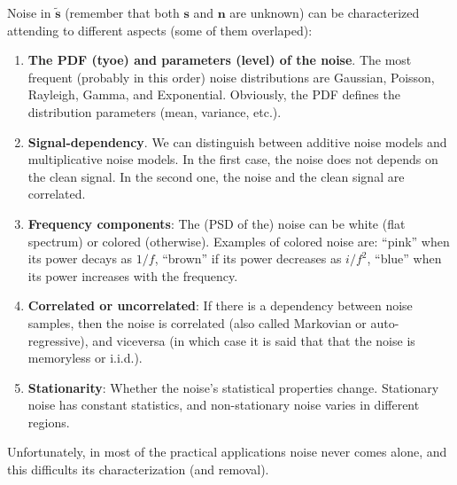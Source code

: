 Noise in $\tilde{\mathbf{s}}$ (remember that both $\mathbf{s}$ and
$\mathbf{n}$ are unknown) can be characterized attending to different
aspects (some of them overlaped):
\begin{enumerate}
\item \textbf{The \gls{PDF} (tyoe) and parameters (level) of the
    noise}. The most frequent (probably in this order) noise
  distributions are Gaussian, Poisson, Rayleigh, Gamma, and
  Exponential. Obviously, the \gls{PDF} defines the distribution
  parameters (mean, variance, etc.).
\item \textbf{Signal-dependency}. We can distinguish between additive
  noise models and multiplicative noise models. In the first case, the
  noise does not depends on the clean signal. In the second one, the
  noise and the clean signal are correlated.
\item \textbf{Frequency components}: The (\gls{PSD} of the) noise can
  be white (flat spectrum) or colored (otherwise). Examples of colored
  noise are: ``pink'' when its power decays as $1/f$, ``brown'' if its
  power decreases as $i/f^2$, ``blue'' when its power increases with
  the frequency.
\item \textbf{Correlated or uncorrelated}: If there is a dependency
  between noise samples, then the noise is correlated (also called Markovian or
  auto-regressive), and viceversa (in which case it is said that that
  the noise is memoryless or i.i.d.).
\item \textbf{Stationarity}: Whether the noise’s statistical
  properties change. Stationary noise has constant statistics, and
  non-stationary noise varies in different regions.
\end{enumerate}

Unfortunately, in most of the practical applications noise never comes
alone, and this difficults its characterization (and removal).

